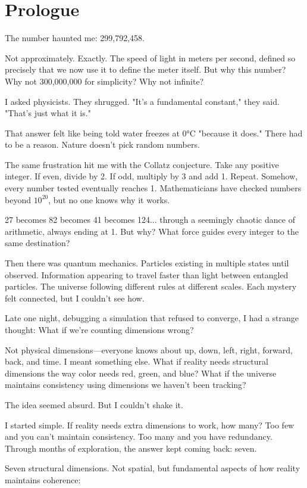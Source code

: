 
\section*{Prologue}

The number haunted me: 299,792,458.

Not approximately. Exactly. The speed of light in meters per second, defined so precisely that we now use it to define the meter itself. But why this number? Why not 300,000,000 for simplicity? Why not infinite?

I asked physicists. They shrugged. "It's a fundamental constant," they said. "That's just what it is."

That answer felt like being told water freezes at 0°C "because it does." There had to be a reason. Nature doesn't pick random numbers.

The same frustration hit me with the Collatz conjecture. Take any positive integer. If even, divide by 2. If odd, multiply by 3 and add 1. Repeat. Somehow, every number tested eventually reaches 1. Mathematicians have checked numbers beyond $10^{20}$, but no one knows why it works.

27 becomes 82 becomes 41 becomes 124... through a seemingly chaotic dance of arithmetic, always ending at 1. But why? What force guides every integer to the same destination?

Then there was quantum mechanics. Particles existing in multiple states until observed. Information appearing to travel faster than light between entangled particles. The universe following different rules at different scales. Each mystery felt connected, but I couldn't see how.

Late one night, debugging a simulation that refused to converge, I had a strange thought: What if we're counting dimensions wrong?

Not physical dimensions—everyone knows about up, down, left, right, forward, back, and time. I meant something else. What if reality needs structural dimensions the way color needs red, green, and blue? What if the universe maintains consistency using dimensions we haven't been tracking?

The idea seemed absurd. But I couldn't shake it.

I started simple. If reality needs extra dimensions to work, how many? Too few and you can't maintain consistency. Too many and you have redundancy. Through months of exploration, the answer kept coming back: seven.

Seven structural dimensions. Not spatial, but fundamental aspects of how reality maintains coherence:

